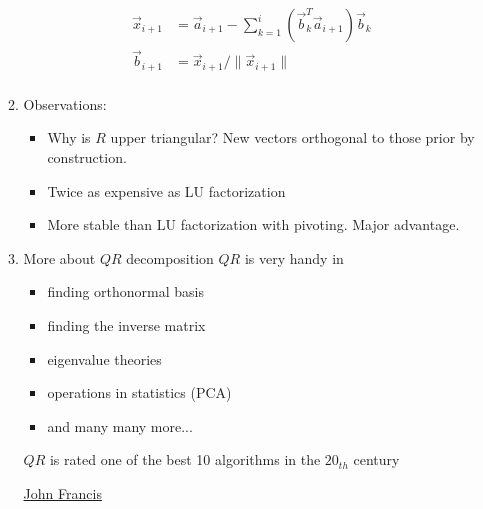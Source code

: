 \documentclass{article}
\theoremstyle{remark}
\begin{document}
\begin{enumerate}
\begin{enumerate}
\begin{equation*}
\begin{split}
\vec x_{i+1} & =  \vec a_{i+1}-\sum_{k=1}^{i}(\vec b_k^T\vec a_{i+1})\vec b_k\\
\vec b_{i+1} & = \vec x_{i+1}/\|\vec x_{i+1}\|\\
\end{split}
\end{equation*}
\item Observations: 
\begin{itemize}
\item Why is $R$ upper triangular? New vectors orthogonal to those prior by construction. 
\item Twice as expensive as LU factorization
\item More stable than LU factorization with pivoting. Major advantage. 
\end{itemize}
\item More about $QR$ decomposition
$QR$ is very handy in 
\begin{itemize}
\item finding orthonormal basis
\item finding the inverse matrix
\item eigenvalue theories
\item operations in statistics (PCA)
\item and many many more...
\end{itemize}
{\color{red}$QR$ is rated one of the best 10 algorithms in the $20_{th}$ century}
\begin{center}
\hyperlink{https://en.wikipedia.org/wiki/John_G._F._Francis}{John Francis}
\end{center}
\end{enumerate}


\end{enumerate}
\end{document}
